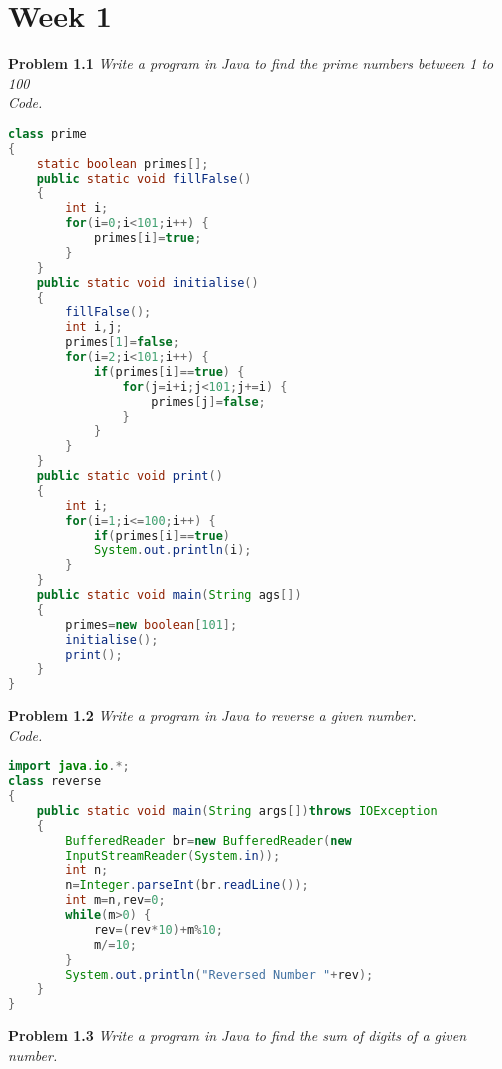 \documentclass[12pt]{article}
\begin{document}
\setlength{\fboxrule}{.5mm}\setlength{\fboxsep}{1.2mm}
\newlength{\boxlength}\setlength{\boxlength}{\textwidth}
\addtolength{\boxlength}{-4mm}
\begin{center}\end{center}
\vspace{5mm}

\section{Week 1}


\textbf{Problem 1.1} \textit{Write a program in Java to find the prime numbers between 1 to 100}\\


\textit{Code.}



\begin{lstlisting}[language=Java]
class prime
{
	static boolean primes[];
	public static void fillFalse()
	{
		int i;
		for(i=0;i<101;i++) {
			primes[i]=true;
		}
	}
	public static void initialise()
	{
		fillFalse();
		int i,j;
		primes[1]=false;
		for(i=2;i<101;i++) {
			if(primes[i]==true) {
				for(j=i+i;j<101;j+=i) {
					primes[j]=false;
				}
			}
		}
	}
	public static void print()
	{
		int i;
		for(i=1;i<=100;i++) {
			if(primes[i]==true)
			System.out.println(i);
		}
	}
	public static void main(String ags[])
	{
		primes=new boolean[101];
		initialise();
		print();
	}
}
\end{lstlisting}

\textbf{Problem 1.2} \textit{Write a program in Java to reverse a given number.}\\


\textit{Code.}

\begin{lstlisting}[language=Java]
import java.io.*;
class reverse
{
	public static void main(String args[])throws IOException
	{
		BufferedReader br=new BufferedReader(new 
		InputStreamReader(System.in));
		int n;
		n=Integer.parseInt(br.readLine());
		int m=n,rev=0;
		while(m>0) {
			rev=(rev*10)+m%10;
			m/=10;
		}
		System.out.println("Reversed Number "+rev);
	}
}
\end{lstlisting}

\textbf{Problem 1.3} \textit{Write a program in Java to find the sum of digits of a given number.}\\
\end{document}
